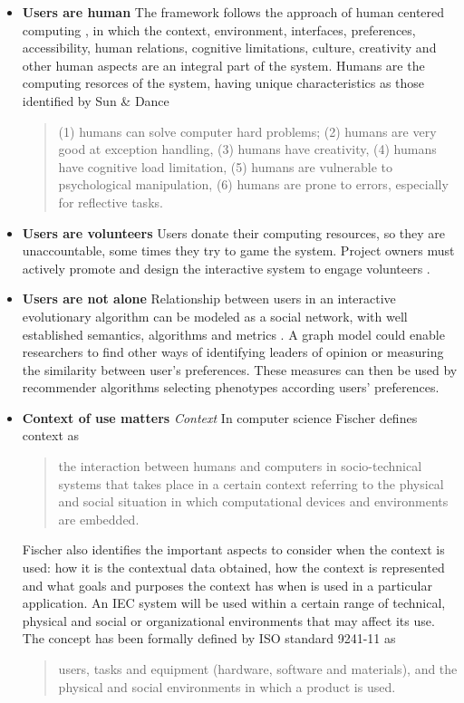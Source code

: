 \begin{itemize}
\item {\bf Users are human} 
  The framework follows the approach of human centered computing \cite{sebe2010human},
  in which the context, environment, interfaces, preferences, accessibility, human relations,
  cognitive limitations, culture, creativity and other human aspects are an integral part 
  of the system. Humans are the computing resorces of the system, having unique characteristics
  as those identified by Sun \& Dance \cite{Sun2013}
\begin{quote}
  (1) humans can solve computer hard problems; (2) humans are very good at exception handling,
  (3) humans have creativity, (4) humans have cognitive load limitation, (5) humans are
  vulnerable to psychological manipulation, (6) humans are prone to errors,
  especially for reflective tasks.
\end{quote}  


\item {\bf Users are volunteers} Users donate their computing resources, so they are 
unaccountable, some times they try to game the system. Project owners must actively promote and
design the interactive system to engage volunteers \cite{oh2015clicking}. %
\item {\bf Users are not alone}
  Relationship between users in an interactive evolutionary algorithm can be modeled
  as a social network, with well established semantics, algorithms and metrics 
  \cite{ahuja1993network}.
  A graph model could enable researchers to find other ways of identifying leaders of 
  opinion or measuring the similarity between user's preferences. 
  These measures can then be used by recommender algorithms selecting 
  phenotypes according users' preferences. 

\item {\bf Context of use matters}
  \textit{Context} In computer science Fischer \cite{fischer2012context}
  defines context as
  \begin{quote}
  the interaction between humans and
  computers in socio-technical systems that takes place in a certain
  context referring to the physical and social situation in which
  computational devices and environments are embedded.
\end{quote}   
  Fischer also identifies the important aspects to consider when the context is used: how it is
  the contextual data obtained, how the context is represented and what
  goals and purposes the context has when is used in a particular
  application.   An IEC system will  be used within a certain range 
  of technical, physical and social or
  organizational environments \cite{maguire2001context} that may affect its use.
  The concept has been formally defined
  by ISO standard 9241-11 \cite{international1998iso} as\begin{quote}
  users,
  tasks and equipment (hardware, software and materials), and the
  physical and social environments in which a product is used.
\end{quote}


\end{itemize}
